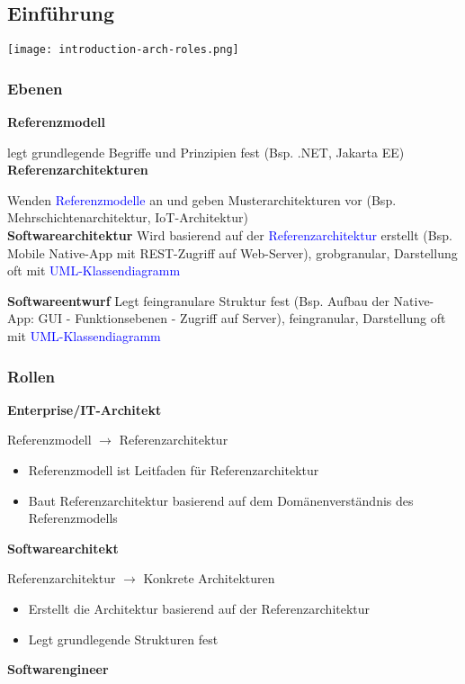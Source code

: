 \subsection{Einführung}

\texttt{[image: introduction-arch-roles.png]}

\subsubsection{Ebenen}

\textbf{Referenzmodell}

legt grundlegende Begriffe und Prinzipien fest (Bsp. .NET, Jakarta EE) \\

\textbf{Referenzarchitekturen}

Wenden \textcolor{blue}{Referenzmodelle} an und geben Musterarchitekturen vor (Bsp. Mehrschichtenarchitektur, IoT-Architektur) \\

\textbf{Softwarearchitektur} Wird basierend auf der
\textcolor{blue}{Referenzarchitektur} erstellt (Bsp. Mobile Native-App mit REST-Zugriff auf Web-Server), grobgranular, Darstellung oft mit \textcolor{blue}{UML-Klassendiagramm}

\textbf{Softwareentwurf}
Legt feingranulare Struktur fest (Bsp. Aufbau der Native-App: GUI - Funktionsebenen - Zugriff auf Server), feingranular, Darstellung oft mit \textcolor{blue}{UML-Klassendiagramm}

\subsubsection{Rollen}
\textbf{Enterprise/IT-Architekt}

Referenzmodell $\rightarrow$ Referenzarchitektur

\begin{itemize}
    \item Referenzmodell ist Leitfaden für Referenzarchitektur
    \item Baut Referenzarchitektur basierend auf dem Domänenverständnis des Referenzmodells
\end{itemize}
\vspace{10pt}
\textbf{Softwarearchitekt}

Referenzarchitektur $\rightarrow$ Konkrete Architekturen

\begin{itemize}
    \item Erstellt die Architektur basierend auf der Referenzarchitektur
    \item Legt grundlegende Strukturen fest
\end{itemize}
\vspace{10pt}
\textbf{Softwarengineer}

